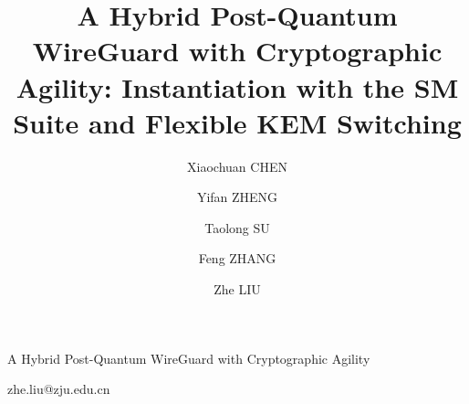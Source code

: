 \documentclass{SCIS2026}
\begin{document}
\DOI{}
\ArtNo{}
\ReceiveDate{}
\ReviseDate{}
\AcceptDate{}
\OnlineDate{}
\AuthorMark{}
\AuthorCitation{}

\title{A Hybrid Post-Quantum WireGuard with Cryptographic Agility:
       Instantiation with the SM Suite and Flexible KEM Switching}
       {A Hybrid Post-Quantum WireGuard with Cryptographic Agility}

\author[1]{Xiaochuan CHEN}{}
\author[1]{Yifan ZHENG}{}
\author[1]{Taolong SU}{}
\author[2]{Feng ZHANG}{}
\author[1]{Zhe LIU}{{zhe.liu@zju.edu.cn}}

\address[1]{School of Software Technology, Zhejiang University, Ningbo 315100, China}
\address[2]{Hangzhou Post-quantum Cryptography Technology Co., Ltd}
\end{document}
